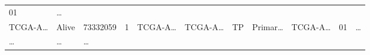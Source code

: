 \documentclass[
]{article}
\begin{document}
\begin{longtable}[]{@{}lllllllllll@{}}
\begin{minipage}[t]{0.10\columnwidth}
01\strut
\end{minipage} & \begin{minipage}[t]{0.03\columnwidth}\raggedright
\ldots{}\strut
\end{minipage}\tabularnewline
\begin{minipage}[t]{0.07\columnwidth}\raggedright
TCGA-A\ldots{}\strut
\end{minipage} & \begin{minipage}[t]{0.04\columnwidth}\raggedright
Alive\strut
\end{minipage} & \begin{minipage}[t]{0.06\columnwidth}\raggedright
73332059\strut
\end{minipage} & \begin{minipage}[t]{0.07\columnwidth}\raggedright
1\strut
\end{minipage} & \begin{minipage}[t]{0.07\columnwidth}\raggedright
TCGA-A\ldots{}\strut
\end{minipage} & \begin{minipage}[t]{0.07\columnwidth}\raggedright
TCGA-A\ldots{}\strut
\end{minipage} & \begin{minipage}[t]{0.07\columnwidth}\raggedright
TP\strut
\end{minipage} & \begin{minipage}[t]{0.07\columnwidth}\raggedright
Primar\ldots{}\strut
\end{minipage} & \begin{minipage}[t]{0.09\columnwidth}\raggedright
TCGA-A\ldots{}\strut
\end{minipage} & \begin{minipage}[t]{0.10\columnwidth}\raggedright
01\strut
\end{minipage} & \begin{minipage}[t]{0.03\columnwidth}\raggedright
\ldots{}\strut
\end{minipage}\tabularnewline
\begin{minipage}[t]{0.07\columnwidth}\raggedright
\ldots{}\strut
\end{minipage} & \begin{minipage}[t]{0.04\columnwidth}\raggedright
\ldots{}\strut
\end{minipage} & \begin{minipage}[t]{0.06\columnwidth}\raggedright
\ldots{}\strut
\end{minipage} & \begin{minipage}[t]{0.07\columnwidth}\raggedright

\end{minipage}
\end{longtable}
\end{document}

